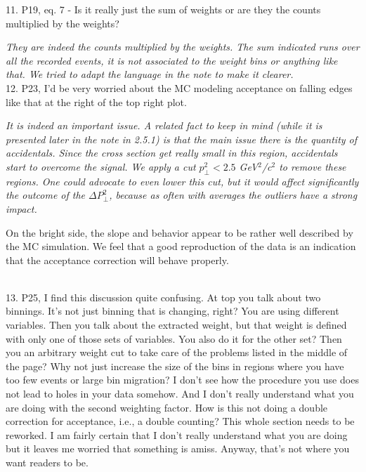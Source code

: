 \documentclass[12pt]{article}
\begin{document}
11.
P19, eq. 7 - Is it really just the sum of weights or are they the counts multiplied by the 
weights?

{\it They are indeed the counts multiplied by the weights.
The sum indicated runs over all the recorded events, it is not associated to the weight
bins or anything like that. We tried to adapt the language in the note to make it clearer.} \\


12.
P23, I’d be very worried about the MC modeling acceptance on falling edges like that at the 
right of the top right plot.

{\it It is indeed an important issue. A related fact to keep in mind (while it is presented 
later in the note in 2.5.1) is that the main issue there is the quantity of accidentals. Since
the cross section get really small in this region, accidentals start to overcome
the signal. We apply a cut
$p_\perp^2 < 2.5$ GeV$^2$/c$^2$ to remove these regions. One could advocate to even lower this 
cut, but it would affect significantly the outcome of the $\Delta P_\perp^2$, 
because as often with averages the outliers have a strong impact.

On the bright side, the slope and behavior appear to be rather well described by the MC
simulation. We feel that a good reproduction of the data is an indication that the 
acceptance correction will behave properly.} \\



13.
P25, I find this discussion quite confusing.   At top you talk about two binnings.  It’s not just 
binning that is changing, right?  You are using different variables.  Then you talk about the 
extracted weight, but that weight is defined with only one of those sets of variables.  You 
also do it for the other set?  Then you an arbitrary weight cut to take care of the problems 
listed in the middle of the page?  Why not just increase the size of the bins in regions where 
you have too few events or large bin migration?  I don’t see how the procedure you use 
does not lead to holes in your data somehow.  And I don’t really understand what you are 
doing with the second weighting factor.  How is this not doing a double correction for 
acceptance, i.e., a double counting?  This whole section needs to be reworked.  I am fairly 
certain that I don’t really understand what you are doing but it leaves me worried that 
something is amiss.  Anyway, that’s not where you want readers to be.  
\end{document}
